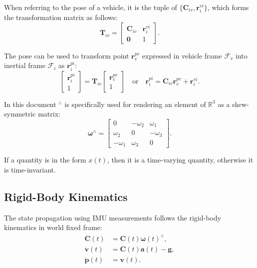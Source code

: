\documentclass[conference]{IEEEtran}
\begin{document}
When referring to the pose of a vehicle, it is the tuple of $\{\textbf{C}_{iv}, \textbf{r}_i^{vi}\}$, which forms the transformation matrix as follows:
$$
\textbf{T}_{iv} = \left[\begin{matrix}
    \textbf{C}_{iv} & \textbf{r}_i^{vi} \\
    \textbf{0} & 1
\end{matrix}\right].
$$

The pose can be used to transform point $\textbf{r}_v^{pv}$ expressed in vehicle frame $\bm{\mathcal{F}}_v$ into inertial frame $\bm{\mathcal{F}}_i$ as $\textbf{r}_i^{pi}$:
$$
\left[\begin{matrix} \textbf{r}_i^{pi} \\ 1 \end{matrix}\right]
    = \textbf{T}_{iv} \left[\begin{matrix} \textbf{r}_v^{pv} \\ 1 \end{matrix}\right]
\quad \text{or} \quad
\textbf{r}_i^{pi} = \textbf{C}_{iv} \textbf{r}_v^{pv} + \textbf{r}_i^{vi}.
$$

In this document $^\wedge$ is specifically used for rendering an element of $\mathbb{R}^3$ as a skew-symmetric matrix:
$$
\bm{\omega}^\wedge = \left[\begin{matrix}
    0 & -\omega_2 & \omega_1 \\
    \omega_2 & 0 & -\omega_3 \\
    -\omega_1 & \omega_3 & 0
\end{matrix}\right].
$$

If a quantity is in the form $x(t)$, then it is a time-varying quantity, otherwise it is time-invariant.

\subsection{Rigid-Body Kinematics}

The state propagation using IMU measurements follows the rigid-body kinematics in world fixed frame:
\begin{equation}
\begin{split}
    \dot{\textbf{C}}(t) &= \textbf{C}(t) \bm{\omega}(t)^\wedge, \\
    \dot{\textbf{v}}(t) &= \textbf{C}(t) \textbf{a}(t) - \textbf{g}, \\
    \dot{\textbf{p}}(t) &= \textbf{v}(t).
\end{split}
\end{equation}
\end{document}

